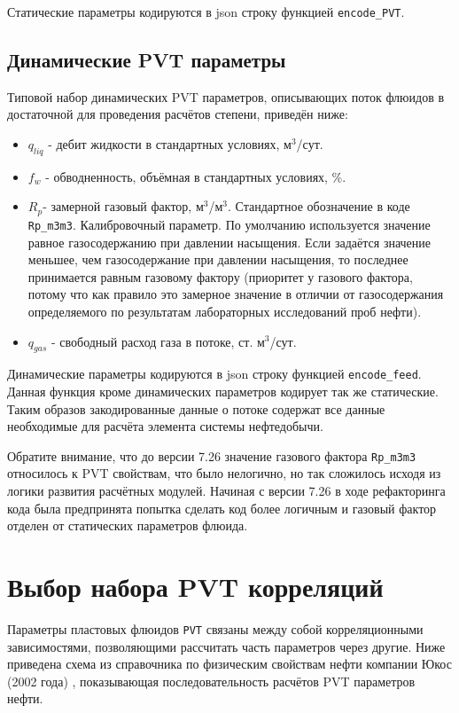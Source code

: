 Статические параметры кодируются в json строку  функцией  \texttt{encode_PVT}.

\subsection{Динамические PVT параметры}
Типовой  набор динамических PVT параметров, описывающих поток флюидов в достаточной для проведения расчётов степени, приведён ниже:

\begin{itemize}
	
	\item $q_{liq}$ - дебит жидкости в стандартных условиях, м$^3$/сут.
	
	\item $f_w$ - обводненность, объёмная в стандартных условиях, \%.
	
	\item $R_p$-  замерной газовый фактор, м$^3$/м$^3$. Стандартное обозначение в коде \texttt{Rp_m3m3}. Калибровочный параметр. По умолчанию используется значение равное газосодержанию при давлении насыщения. Если задаётся значение меньшее, чем газосодержание при давлении насыщения, то последнее принимается равным газовому фактору (приоритет у газового фактора, потому что как правило это замерное значение в отличии от газосодержания определяемого по результатам лабораторных исследований проб нефти).
	
	\item $q_{gas}$ - свободный расход газа в потоке, ст. м$^3$/сут.
	
\end{itemize}

Динамические параметры кодируются в json строку  функцией  \texttt{encode_feed}. Данная функция кроме динамических параметров кодирует так же статические. Таким образов закодированные данные о потоке содержат все данные необходимые для расчёта элемента системы нефтедобычи.

Обратите внимание, что до версии 7.26 значение газового фактора \texttt{Rp_m3m3} относилось к PVT свойствам, что было нелогично, но так сложилось исходя из логики развития расчётных модулей. Начиная с версии 7.26 в ходе рефакторинга кода была предпринята попытка сделать код более логичным и газовый фактор отделен от статических параметров флюида.

\section{Выбор набора PVT корреляций}
Параметры пластовых флюидов \texttt{PVT} связаны между собой корреляционными зависимостями, позволяющими рассчитать часть параметров через другие. Ниже приведена схема из справочника по физическим свойствам нефти компании Юкос (2002 года) \cite{Yukos_PVT_2002}, показывающая последовательность расчётов PVT параметров нефти.

